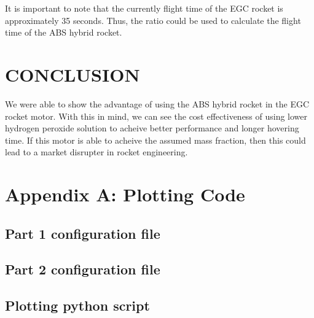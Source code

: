 \documentclass[cleanfoot,cleanhead,onecolumn,12pt,notitlepage]{asme2e}
\begin{document}
It is important to note that the currently flight time of the EGC rocket is approximately 35 seconds.  Thus, the ratio could be used to calculate the flight time of the ABS hybrid rocket.  

\section{CONCLUSION}

We were able to show the advantage of using the ABS hybrid rocket in the EGC rocket motor.  With this in mind, we can see the cost effectiveness of using lower hydrogen peroxide solution to acheive better performance and longer hovering time.  If this motor is able to acheive the assumed mass fraction, then this could lead to a market disrupter in rocket engineering.  



%
%


%

\appendix

\section{Appendix A: Plotting Code}
\label{sec:code}

\subsection{Part 1 configuration file}
\label{sec:A1}


\subsection{Part 2 configuration file}
\label{sec:A2}


\subsection{Plotting python script}

\end{document}
